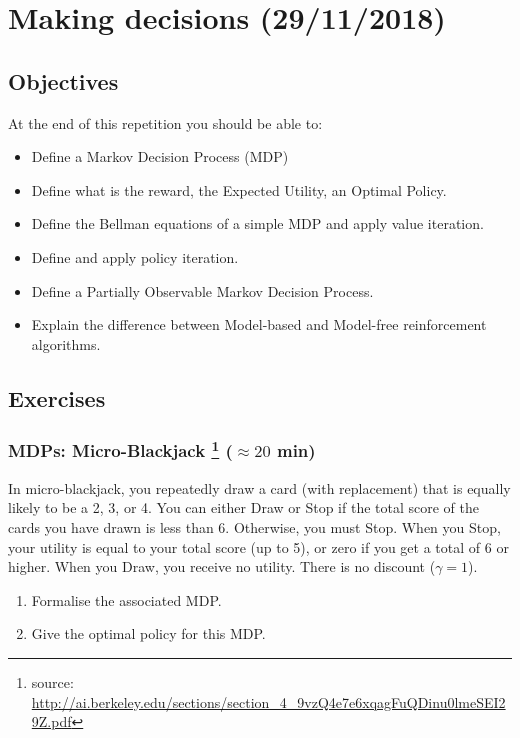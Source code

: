 \documentclass[a4paper, 10pt]{article}
\begin{document}


   \setcounter{page}{1}
   \section{Making decisions (29/11/2018)}
   
   \subsection{Objectives}
   At the end of this repetition you should be able to:
   \begin{itemize}
       \item Define a Markov Decision Process (MDP)
       \item Define what is the reward, the Expected Utility, an Optimal Policy.
       \item Define the Bellman equations of a simple MDP and apply value iteration.
       \item Define and apply policy iteration.
       \item Define a Partially Observable Markov Decision Process.
       \item Explain the difference between Model-based and Model-free reinforcement algorithms.
   \end{itemize}
   \subsection{Exercises}
   \subsubsection{MDPs: Micro-Blackjack \protect\footnote{source: \url{http://ai.berkeley.edu/sections/section_4_9vzQ4e7e6xqagFuQDinu0lmeSEI29Z.pdf}} ($\approx 20$ min)}
   In micro-blackjack, you repeatedly draw a card (with replacement) that is equally likely to be a 2, 3, or 4. You
can either Draw or Stop if the total score of the cards you have drawn is less than 6. Otherwise, you must Stop.
When you Stop, your utility is equal to your total score (up to 5), or zero if you get a total of 6 or higher. When
you Draw, you receive no utility. There is no discount ($\gamma = 1$).
\begin{enumerate}
    \item Formalise the associated MDP.
    \item Give the optimal policy for this MDP.
\end{enumerate}
\end{document}
